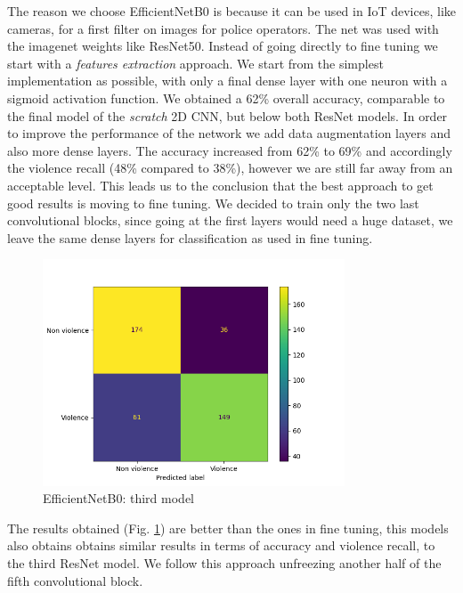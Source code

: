 The reason we choose EfficientNetB0 is because it can be used in IoT devices, like cameras, for a first filter on images for police operators. The net was used with the imagenet weights like ResNet50.
Instead of going directly to fine tuning we start with a \textit{features extraction} approach.
We start from the simplest implementation as possible, with only a final dense layer with one neuron with a sigmoid activation function.
We obtained a 62\% overall accuracy, comparable to the final model of the \emph{scratch} 2D CNN, but below both ResNet models. In order to improve the performance of the network we add data augmentation layers and also more dense layers.
The accuracy increased from 62\% to 69\% and accordingly the violence recall (48\% compared to 38\%), however we are still far away from an acceptable level. This leads us to the conclusion that the best approach to get good results is moving to fine tuning. 
We decided to train only the two last convolutional blocks, since going at the first layers would need a huge dataset, we leave the same dense layers for classification as used in fine tuning. 
\begin{figure}[h!]
    \centering
    \includegraphics[width=0.8\textwidth]{images/731a-EfficientNetB0_15-5a4e-conf_matrix.png}
    \caption{EfficientNetB0: third model}
    \label{fig:EfficientNetB0_15}
\end{figure}
The results obtained (Fig. \ref{fig:EfficientNetB0_15}) are better than the ones in fine tuning, this models also obtains obtains similar results in terms of accuracy and violence recall, to the third ResNet model.
We follow this approach unfreezing another half of the fifth convolutional block.
